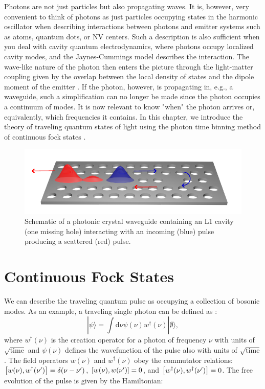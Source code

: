 Photons are not just particles but also propagating waves. It is, however, very convenient to think of photons as just particles occupying states in the harmonic oscillator when describing interactions between photons and emitter systems such as atoms, quantum dots, or NV centers. Such a description is also sufficient when you deal with cavity quantum electrodynamics, where photons occupy localized cavity modes, and the Jaynes-Cummings model describes the interaction. The wave-like nature of the photon then enters the picture through the light-matter coupling given by the overlap between the local density of states and the dipole moment of the emitter \cite{Lodahl2015InterfacingNanostructuresb}. If the photon, however, is propagating in, e.g., a waveguide, such a simplification can no longer be made since the photon occupies a continuum of modes. It is now relevant to know "when" the photon arrives or, equivalently, which frequencies it contains. In this chapter, we introduce the theory of traveling quantum states of light using the photon time binning method of continuous fock states \cite{Heuck2020Photon-photonCavities}.  

\begin{figure}[H]
    \centering
    \includegraphics[width=\linewidth]{figures/onesided_cavity.pdf}
    \caption{Schematic of a photonic crystal waveguide containing an L1 cavity (one missing hole) interacting with an incoming (blue) pulse producing a scattered (red) pulse.}
    \label{fig:onesided_wg}
\end{figure}

\section{Continuous Fock States}
We can describe the traveling quantum pulse as occupying a collection of bosonic modes. As an example, a traveling single photon can be defined as \cite{Ciccarello2018CollisionOptics}:
\begin{equation}
    |\psi\rangle=\int \mathrm{d} \nu \psi(\nu) w^{\dagger}(\nu)| \emptyset \rangle,
\end{equation}
where $w^{\dagger}(\nu)$ is the creation operator for a photon of frequency $\nu$ with units of $\sqrt{\mathrm{time}}$ and $\psi(\nu)$ defines the wavefunction of the pulse also with units of $\sqrt{\mathrm{time}}$. The field operators $w(\nu)$ and $w^\dagger(\nu)$ obey the commutator relations: $\comm{w(\nu)}{w^\dagger(\nu ')} = \delta(\nu - \nu ')$, $\comm{w(\nu)}{w(\nu ')} = 0$, and $\comm{w^\dagger(\nu)}{w^\dagger(\nu ')} = 0$. The free evolution of the pulse is given by the Hamiltonian:

